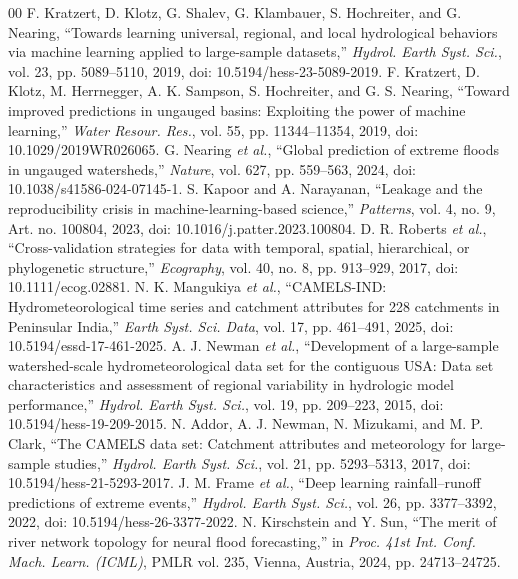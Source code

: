 \documentclass[conference]{IEEEtran}
\begin{document}
\balance
\begin{thebibliography}{00}
 F. Kratzert, D. Klotz, G. Shalev, G. Klambauer, S. Hochreiter, and G. Nearing, ``Towards learning universal, regional, and local hydrological behaviors via machine learning applied to large-sample datasets,'' \textit{Hydrol. Earth Syst. Sci.}, vol. 23, pp. 5089--5110, 2019, doi: 10.5194/hess-23-5089-2019.
 F. Kratzert, D. Klotz, M. Herrnegger, A. K. Sampson, S. Hochreiter, and G. S. Nearing, ``Toward improved predictions in ungauged basins: Exploiting the power of machine learning,'' \textit{Water Resour. Res.}, vol. 55, pp. 11344--11354, 2019, doi: 10.1029/2019WR026065.
 G. Nearing \textit{et al.}, ``Global prediction of extreme floods in ungauged watersheds,'' \textit{Nature}, vol. 627, pp. 559--563, 2024, doi: 10.1038/s41586-024-07145-1.
 S. Kapoor and A. Narayanan, ``Leakage and the reproducibility crisis in machine-learning-based science,'' \textit{Patterns}, vol. 4, no. 9, Art. no. 100804, 2023, doi: 10.1016/j.patter.2023.100804.
 D. R. Roberts \textit{et al.}, ``Cross-validation strategies for data with temporal, spatial, hierarchical, or phylogenetic structure,'' \textit{Ecography}, vol. 40, no. 8, pp. 913--929, 2017, doi: 10.1111/ecog.02881.
 N. K. Mangukiya \textit{et al.}, ``CAMELS-IND: Hydrometeorological time series and catchment attributes for 228 catchments in Peninsular India,'' \textit{Earth Syst. Sci. Data}, vol. 17, pp. 461--491, 2025, doi: 10.5194/essd-17-461-2025.
 A. J. Newman \textit{et al.}, ``Development of a large-sample watershed-scale hydrometeorological data set for the contiguous USA: Data set characteristics and assessment of regional variability in hydrologic model performance,'' \textit{Hydrol. Earth Syst. Sci.}, vol. 19, pp. 209--223, 2015, doi: 10.5194/hess-19-209-2015.
 N. Addor, A. J. Newman, N. Mizukami, and M. P. Clark, ``The CAMELS data set: Catchment attributes and meteorology for large-sample studies,'' \textit{Hydrol. Earth Syst. Sci.}, vol. 21, pp. 5293--5313, 2017, doi: 10.5194/hess-21-5293-2017.
 J. M. Frame \textit{et al.}, ``Deep learning rainfall--runoff predictions of extreme events,'' \textit{Hydrol. Earth Syst. Sci.}, vol. 26, pp. 3377--3392, 2022, doi: 10.5194/hess-26-3377-2022.
 N. Kirschstein and Y. Sun, ``The merit of river network topology for neural flood forecasting,'' in \textit{Proc. 41st Int. Conf. Mach. Learn. (ICML)}, PMLR vol. 235, Vienna, Austria, 2024, pp. 24713--24725.

\end{thebibliography}
\end{document}
